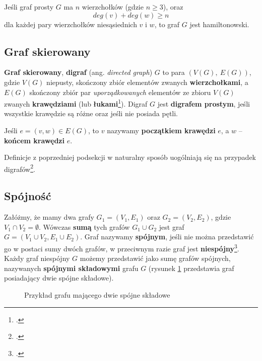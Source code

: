\begin{theorem}[Orego, 1960]\label{theorem:orego}
Jeśli graf prosty $G$ ma $n$ wierzchołków (gdzie $n\geq 3$), oraz
\[
deg(v) + deg(w) \geq n
\]
dla każdej pary wierzchołków niesąsiednich $v$ i $w$, to graf $G$ jest hamiltonowski.
\end{theorem}

\subsection*{Graf skierowany}

\textbf{Graf skierowany}, \textbf{digraf} (ang. \textit{directed graph}) $G$ to para $(V(G),\ E(G))$, gdzie $V(G)$ niepusty, skończony zbiór elementów zwanych \textbf{wierzchołkami}, a $E(G)$ skończony zbiór par \emph{uporządkowanych} elementów ze zbioru $V(G)$ zwanych \textbf{krawędziami} (lub \textbf{łukami}\footcite[135]{wilson}). Digraf $G$ jest \textbf{digrafem prostym}, jeśli wszystkie krawędzie są różne oraz jeśli nie posiada pętli. 

Jeśli $e = (v,w) \in E(G)$, to $v$ nazywamy \textbf{początkiem krawędzi} $e$, a $w$ -- \textbf{końcem krawędzi} $e$.

Definicje z poprzedniej podsekcji w naturalny sposób uogólniają się na przypadek digrafów\footcite[136]{wilson}. 

\subsection*{Spójność}

Załóżmy, że mamy dwa grafy $G_1 = (V_1,E_1)$ oraz $G_2 = (V_2,E_2)$, gdzie $V_1 \cap V_2 = \emptyset$. Wówczas \textbf{sumą} tych grafów $G_1 \cup G_2$ jest graf $G=(V_1\cup V_2, E_1\cup E_2)$. Graf nazywamy \textbf{spójnym}, jeśli nie można przedstawić go w postaci sumy dwóch grafów, w przeciwnym razie graf jest \textbf{niespójny}\footcite[22]{wilson}. Każdy graf niespójny $G$ możemy przedstawić jako sumę grafów spójnych, nazywanych \textbf{spójnymi składowymi} grafu $G$ (rysunek \ref{fig:connected-copoments-example} przedstawia graf posiadający dwie spójne składowe). 

\begin{figure}[h]
\centering
{}
\caption{Przykład grafu mającego dwie spójne składowe} \label{fig:connected-copoments-example}
\end{figure}

